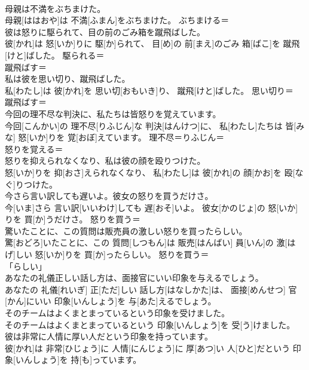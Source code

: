\documentclass[8pt]{extreport}
\begin{document}
\begin{CJK}{UTF8}{min}
\\	母親は不満をぶちまけた。	
\\	母親[ははおや]は 不満[ふまん]をぶちまけた。	ぶちまける＝ 
\\	彼は怒りに駆られて、目の前のごみ箱を蹴飛ばした。	
\\	彼[かれ]は 怒[いか]りに 駆[か]られて、 目[め]の 前[まえ]のごみ 箱[ばこ]を 蹴飛[けと]ばした。	駆られる＝ 
\\	蹴飛ばす＝ 
\\	私は彼を思い切り、蹴飛ばした。	
\\	私[わたし]は 彼[かれ]を 思い切[おもいき]り、 蹴飛[けと]ばした。	思い切り＝ 
\\	蹴飛ばす＝ 
\\	今回の理不尽な判決に、私たちは皆怒りを覚えています。	
\\	今回[こんかい]の 理不尽[りふじん]な 判決[はんけつ]に、 私[わたし]たちは 皆[みな] 怒[いか]りを 覚[おぼ]えています。	理不尽＝りふじん＝ 
\\	怒りを覚える＝ 
\\	怒りを抑えられなくなり、私は彼の顔を殴りつけた。	
\\	怒[いか]りを 抑[おさ]えられなくなり、 私[わたし]は 彼[かれ]の 顔[かお]を 殴[なぐ]りつけた。	
\\	今さら言い訳しても遅いよ。彼女の怒りを買うだけさ。	
\\	今[いま]さら 言い訳[いいわけ]しても 遅[おそ]いよ。 彼女[かのじょ]の 怒[いか]りを 買[か]うだけさ。	怒りを買う＝ 
\\	驚いたことに、この質問は販売員の激しい怒りを買ったらしい。	
\\	驚[おどろ]いたことに、この 質問[しつもん]は 販売[はんばい] 員[いん]の 激[はげ]しい 怒[いか]りを 買[か]ったらしい。	怒りを買う＝ 
\\	「らしい」
\\	あなたの礼儀正しい話し方は、面接官にいい印象を与えるでしょう。	
\\	あなたの 礼儀[れいぎ] 正[ただ]しい 話し方[はなしかた]は、 面接[めんせつ] 官[かん]にいい 印象[いんしょう]を 与[あた]えるでしょう。	
\\	そのチームはよくまとまっているという印象を受けました。	
\\	そのチームはよくまとまっているという 印象[いんしょう]を 受[う]けました。	
\\	彼は非常に人情に厚い人だという印象を持っています。	
\\	彼[かれ]は 非常[ひじょう]に 人情[にんじょう]に 厚[あつ]い 人[ひと]だという 印象[いんしょう]を 持[も]っています。	

\end{CJK}
\end{document}
